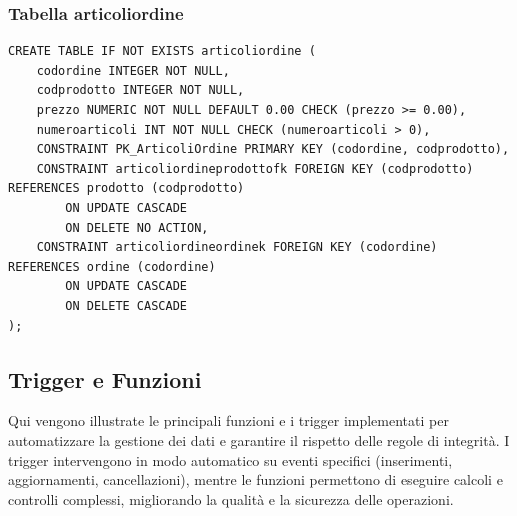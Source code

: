 \documentclass[a4paper,12pt]{article}
\begin{document}
\subsubsection*{Tabella articoliordine}

\vspace{1.5em}
\begin{lstlisting}[style=sqlstyle]
CREATE TABLE IF NOT EXISTS articoliordine (
    codordine INTEGER NOT NULL,
    codprodotto INTEGER NOT NULL,
    prezzo NUMERIC NOT NULL DEFAULT 0.00 CHECK (prezzo >= 0.00),
    numeroarticoli INT NOT NULL CHECK (numeroarticoli > 0),
    CONSTRAINT PK_ArticoliOrdine PRIMARY KEY (codordine, codprodotto),
    CONSTRAINT articoliordineprodottofk FOREIGN KEY (codprodotto) REFERENCES prodotto (codprodotto)
        ON UPDATE CASCADE
        ON DELETE NO ACTION,
    CONSTRAINT articoliordineordinek FOREIGN KEY (codordine) REFERENCES ordine (codordine)
        ON UPDATE CASCADE
        ON DELETE CASCADE
);
\end{lstlisting}
\vspace{1.5em}

\subsection{Trigger e Funzioni}
\noindent
Qui vengono illustrate le principali funzioni e i trigger implementati per automatizzare la gestione dei dati e garantire il rispetto delle regole di integrità. I trigger intervengono in modo automatico su eventi specifici (inserimenti, aggiornamenti, cancellazioni), mentre le funzioni permettono di eseguire calcoli e controlli complessi, migliorando la qualità e la sicurezza delle operazioni.
\end{document}
